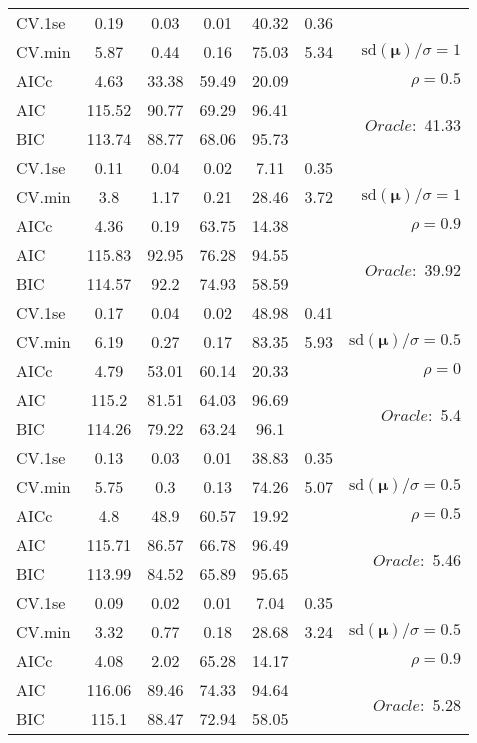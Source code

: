 \begin{table}
\begin{center}
\begin{tabular}{l*{5}{c}|r}
 \hline 
CV.1se & 0.19 & 0.03 & 0.01 & 40.32 & 0.36 & \\
CV.min & 5.87 & 0.44 & 0.16 & 75.03 & 5.34 &  $\mathrm{sd}(\mathbf{\mu})/\sigma=1$ \\
AICc & 4.63 & 33.38 & 59.49 & 20.09 & & $\rho=0.5$ \\
AIC & 115.52 & 90.77 & 69.29 & 96.41 & &  \multirow{2}{*}{$Oracle: $ 41.33} \\
BIC & 113.74 & 88.77 & 68.06 & 95.73 & &  \\
 \hline 
CV.1se & 0.11 & 0.04 & 0.02 & 7.11 & 0.35 & \\
CV.min & 3.8 & 1.17 & 0.21 & 28.46 & 3.72 &  $\mathrm{sd}(\mathbf{\mu})/\sigma=1$ \\
AICc & 4.36 & 0.19 & 63.75 & 14.38 & & $\rho=0.9$ \\
AIC & 115.83 & 92.95 & 76.28 & 94.55 & &  \multirow{2}{*}{$Oracle: $ 39.92} \\
BIC & 114.57 & 92.2 & 74.93 & 58.59 & &  \\
 \hline 
CV.1se & 0.17 & 0.04 & 0.02 & 48.98 & 0.41 & \\
CV.min & 6.19 & 0.27 & 0.17 & 83.35 & 5.93 &  $\mathrm{sd}(\mathbf{\mu})/\sigma=0.5$ \\
AICc & 4.79 & 53.01 & 60.14 & 20.33 & & $\rho=0$ \\
AIC & 115.2 & 81.51 & 64.03 & 96.69 & &  \multirow{2}{*}{$Oracle: $ 5.4} \\
BIC & 114.26 & 79.22 & 63.24 & 96.1 & &  \\
 \hline 
CV.1se & 0.13 & 0.03 & 0.01 & 38.83 & 0.35 & \\
CV.min & 5.75 & 0.3 & 0.13 & 74.26 & 5.07 &  $\mathrm{sd}(\mathbf{\mu})/\sigma=0.5$ \\
AICc & 4.8 & 48.9 & 60.57 & 19.92 & & $\rho=0.5$ \\
AIC & 115.71 & 86.57 & 66.78 & 96.49 & &  \multirow{2}{*}{$Oracle: $ 5.46} \\
BIC & 113.99 & 84.52 & 65.89 & 95.65 & &  \\
 \hline 
CV.1se & 0.09 & 0.02 & 0.01 & 7.04 & 0.35 & \\
CV.min & 3.32 & 0.77 & 0.18 & 28.68 & 3.24 &  $\mathrm{sd}(\mathbf{\mu})/\sigma=0.5$ \\
AICc & 4.08 & 2.02 & 65.28 & 14.17 & & $\rho=0.9$ \\
AIC & 116.06 & 89.46 & 74.33 & 94.64 & &  \multirow{2}{*}{$Oracle: $ 5.28} \\
BIC & 115.1 & 88.47 & 72.94 & 58.05 & &  \\
 \hline 
\end{tabular}
\end{center}
\vspace{-1cm}
\end{table}




